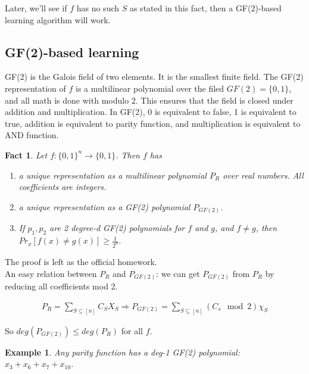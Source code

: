 \documentclass[12pt]{article}
\newtheorem{fact}[theorem]{Fact}
\newtheorem{example}[theorem]{Example}
\begin{document}
Later, we'll see if $f$ has no such $S$ as stated in this fact, then
a GF(2)-based learning algorithm will work.

\subsection{GF(2)-based learning}

GF(2) is the Galois field of two elements. It is the smallest finite
field. The GF(2) representation of $f$ is a multilinear polynomial
over the filed $GF(2) = \{ 0, 1 \}$, and all math is done with modulo
2. This ensures that the field is closed under addition and 
multiplication. In GF(2), 0 is equivalent to false, 1 is equivalent to
true, addition is equivalent to parity function, and multiplication is
equivalent to AND function. \\

\begin{fact}
Let $f: \{ 0, 1 \}^n \rightarrow \{ 0, 1\}$. Then $f$ has
\begin{enumerate}
\item a unique representation as a multilinear polynomial $P_R$ over
  real numbers. All coefficients are integers.
\item a unique representation as a GF(2) polynomial $P_{GF(2)}$.
\item If $p_1, p_2$ are 2 degree-d GF(2) polynomials for $f$ and $g$,
  and $f \neq g$, then $Pr_x [ f(x) \neq g(x) ] \ge \frac
  {1}{2^d}$.
\end{enumerate}

\end{fact}

The proof is left as the official homework. \\

An easy relation between $P_R$ and $P_{GF(2)}$: we can get $P_{GF(2)}$
from $P_R$ by reducing all coefficients mod 2.

\begin{eqnarray*}
P_R = \sum_{S \subseteq [n]}
{C_S X_S}
\Rightarrow P_{GF(2)} = \sum_{S \subseteq [n]} (C_s \mod 2) \chi_S
\end{eqnarray*}

So $deg(P_{GF(2)}) \le deg(P_R)$ for all $f$. \\

\begin{example}
Any parity function has a deg-1 GF(2) polynomial: $ x_3 + x_6 + x_7 +
x_{10}$.
\end{example}
\end{document}
